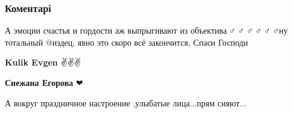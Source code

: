  
 
 
 
 
\subsubsection{Коментарі}

\begin{itemize}
 
А эмоции счастья и гордости аж выпрыгивают из объектива🤦♂️🤦♂️🤦♂️🤦♂️🤦♂️🤦♂️ну
тотальный @издец, явно это скоро всё закончится, Спаси Господи🙏

\begin{itemize}
 
\textbf{Kulik Evgen} ✌️✌️✌️

 
\textbf{Снежана Егорова} ❤
\end{itemize}

 
А вокруг праздничное настроение ,улыбатые лица...прям сияют...

\begin{itemize}
 

\end{itemize}
\end{itemize}
